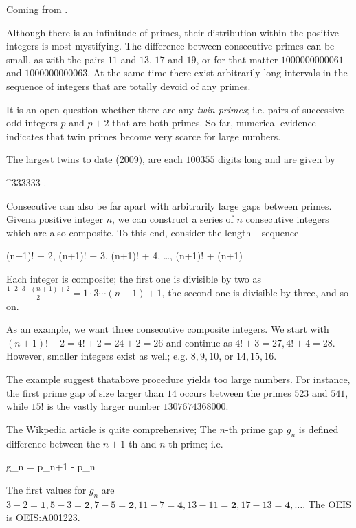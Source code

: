 
Coming from \cite{Burton2011}.

Although there is an inﬁnitude of primes, their distribution within the positive integers is most mystifying. The difference between consecutive primes can be small, as with the pairs $11$ and $13$, $17$ and $19$, or for that matter $1000000000061$ and $1000000000063$. At the same time there exist arbitrarily long intervals in the sequence of integers that are totally devoid of any primes.

It is an open question whether there are any \emph{twin primes}; i.e. pairs of successive odd integers $p$ and $p+2$ that are both primes. So far, numerical evidence indicates that twin primes become very scarce for large numbers.

The largest twins to date (2009), are each $100355$ digits long and are given by

 ^{333333}  .
\eee

Consecutive can also be far apart with arbitrarily large gaps between primes. Givena positive integer $n$, we can construct a series of $n$ consecutive integers which are also composite. To this end, consider the length$-$ sequence

\bee
(n+1)! + 2, (n+1)! + 3, (n+1)! + 4, \ldots, (n+1)! + (n+1)
\eee

Each integer is composite; the first one is divisible by two as $\frac{1 \cdot 2 \cdot 3 \cdots (n+1) + 2}{2} = 1 \cdot 3 \cdots (n+1) + 1$, the second one is divisible by three, and so on.

As an example, we want three consecutive composite integers. We start with $(n+1)! + 2 = 4! + 2 = 24+2 = 26$ and continue as $4! + 3 = 27, 4! + 4 = 28$. However, smaller integers exist as well; e.g. $8, 9, 10$, or $14, 15, 16$.

The example suggest thatabove procedure yields too large numbers. For instance, the first prime gap of size larger than $14$ occurs between the primes $523$ and $541$, while $15!$ is the vastly larger number $1307674368000$. 

The \href{https://en.wikipedia.org/wiki/Prime_gap}{Wikpedia article} is quite comprehensive; The $n$-th prime gap $g_n$ is defined difference between the $n+1$-th and $n$-th prime; i.e.

\bee
g_n = p_{n+1} - p_n
\eee

The first values for $g_n$ are $3-2 = \mathbf{1}, 5 - 3 = \mathbf{2}, 7 - 5 = \mathbf{2}, 11 - 7 = \mathbf{4}, 13 - 11 = \mathbf{2}, 17 - 13 = \mathbf{4}, \ldots$. The OEIS is \href{https://oeis.org/A001223}{OEIS:A001223}.

